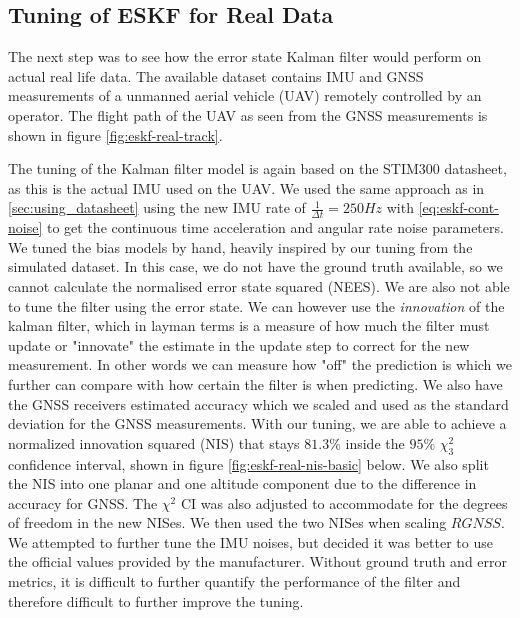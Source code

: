 \subsection{Tuning of ESKF for Real Data} \label{a2task3}
The next step was to see how the error state Kalman filter would perform on actual real life data. The available dataset contains IMU and GNSS measurements of a unmanned aerial vehicle (UAV) remotely controlled by an operator. The flight path of the UAV as seen from the GNSS measurements is shown in figure \ref{fig:eskf-real-track}.

The tuning of the Kalman filter model is again based on the STIM300 datasheet, as this is the actual IMU used on the UAV. We used the same approach as in \cref{sec:using_datasheet} using the new IMU rate of $\frac{1}{\Delta t} = 250Hz$ with \cref{eq:eskf-cont-noise} to get the continuous time acceleration and angular rate noise parameters. We tuned the bias models by hand, heavily inspired by our tuning from the simulated dataset. In this case, we do not have the ground truth available, so we cannot calculate the normalised error state squared (NEES). We are also not able to tune the filter using the error state. We can however use the \textit{innovation} of the kalman filter, which in layman terms is a measure of how much the filter must update or "innovate" the estimate in the update step to correct for the new measurement. In other words we can measure how "off" the prediction is which we further can compare with how certain the filter is when predicting. We also have the GNSS receivers estimated accuracy which we scaled and used as the standard deviation for the GNSS measurements. With our tuning, we are able to achieve a normalized innovation squared (NIS) that stays $81.3\%$ inside the $95\%$ $\chi_3^2$ confidence interval, shown in figure \ref{fig:eskf-real-nis-basic} below. We also split the NIS into one planar and one altitude component due to the difference in accuracy for GNSS. The $\chi^2$ CI was also adjusted to accommodate for the degrees of freedom in the new NISes. We then used the two NISes when scaling $RGNSS$. We attempted to further tune the IMU noises, but decided it was better to use the official values provided by the manufacturer. Without ground truth and error metrics, it is difficult to further quantify the performance of the filter and therefore difficult to further improve the tuning.



